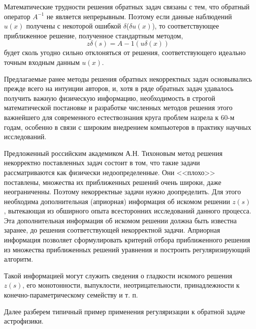 \documentclass[12pt, a4paper]{article}
\begin{document}
	Математические трудности решения обратных задач связаны с тем, что обратный оператор $A^{-1}$ не является непрерывным. Поэтому если данные наблюдений $u(x)$ получены с некоторой ошибкой $\delta$($\delta u(x)$), то соответствующее приближенное решение, полученное стандартным методом,
	$$
	z\delta(s)= A -1 (u\delta(x))
	$$
	будет сколь угодно сильно отклоняться от решения, соответствующего идеально точным входным данным $u(x)$.
	
	Предлагаемые ранее методы решения обратных некорректных задач основывались прежде всего на интуиции авторов, и, хотя в ряде обратных задач удавалось получить важную физическую информацию, необходимость в строгой математической постановке и разработке численных методов решения этого важнейшего для современного естествознания круга проблем назрела к 60-м годам, особенно в связи с широким внедрением компьютеров в практику научных исследований.

	Предложенный российским академиком А.Н. Тихоновым метод решения некорректно поставленных задач состоит в том, что такие задачи рассматриваются как физически недоопределенные. Они <<плохо>> поставлены, множества их приближенных решений очень широки, даже неограниченны. Поэтому некорректные задачи нужно доопределить. Для этого необходима дополнительная (априорная) информация об искомом решении $z(s)$, вытекающая из обширного опыта всесторонних исследований данного процесса. Эта дополнительная информация об искомом решении должна быть известна заранее, до решения соответствующей некорректной задачи. Априорная информация позволяет сформулировать критерий отбора приближенного решения из множества приближенных решений уравнения и построить регуляризирующий алгоритм.

	Такой информацией могут служить сведения о гладкости искомого решения $z(s)$, его монотонности, выпуклости, неотрицательности, принадлежности к конечно-параметрическому семейству и т. п.

	Далее разберем типичный пример применения регуляризации к обратной задаче астрофизики.
\end{document}
